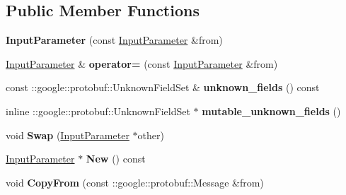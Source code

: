 \subsection*{Public Member Functions}
\begin{DoxyCompactItemize}
\item 
\mbox{\label{classcaffe_1_1_input_parameter_adb45760e1c8449d06f484c86c00fe50d}} 
{\bfseries Input\+Parameter} (const \mbox{\hyperlink{classcaffe_1_1_input_parameter}{Input\+Parameter}} \&from)
\item 
\mbox{\label{classcaffe_1_1_input_parameter_a938b6e3a6f4e4971580b6e15b6e26771}} 
\mbox{\hyperlink{classcaffe_1_1_input_parameter}{Input\+Parameter}} \& {\bfseries operator=} (const \mbox{\hyperlink{classcaffe_1_1_input_parameter}{Input\+Parameter}} \&from)
\item 
\mbox{\label{classcaffe_1_1_input_parameter_af7b2adc5748e48c34b06284f503805d6}} 
const \+::google\+::protobuf\+::\+Unknown\+Field\+Set \& {\bfseries unknown\+\_\+fields} () const
\item 
\mbox{\label{classcaffe_1_1_input_parameter_a240d02c33beb17f329ea4c3e28b409b0}} 
inline \+::google\+::protobuf\+::\+Unknown\+Field\+Set $\ast$ {\bfseries mutable\+\_\+unknown\+\_\+fields} ()
\item 
\mbox{\label{classcaffe_1_1_input_parameter_af6fc9b057c06389b7bec857e440ded39}} 
void {\bfseries Swap} (\mbox{\hyperlink{classcaffe_1_1_input_parameter}{Input\+Parameter}} $\ast$other)
\item 
\mbox{\label{classcaffe_1_1_input_parameter_a6c1f48f093f383ce7dbd558509e2729c}} 
\mbox{\hyperlink{classcaffe_1_1_input_parameter}{Input\+Parameter}} $\ast$ {\bfseries New} () const
\item 
\mbox{\label{classcaffe_1_1_input_parameter_aac255a9730d65111ec00ac61a3a92a45}} 
void {\bfseries Copy\+From} (const \+::google\+::protobuf\+::\+Message \&from)
\item 
\mbox{\label{classcaffe_1_1_input_parameter_a49ba699dae00420b356b64c73586410e}} 

\end{DoxyCompactItemize}
